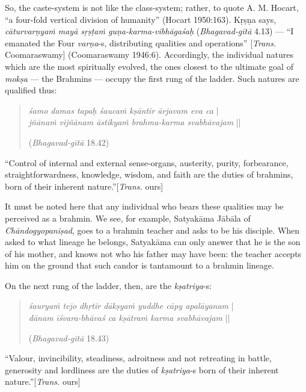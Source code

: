So, the caste-system is not like the class-system; rather, to quote A. M. Hocart, “a four-fold vertical division of humanity” (Hocart 1950:163). Kṛṣṇa says, {\sl cāturvarṇyaṁ mayā sṛṣṭaṁ guṇa-karma-vibhāgaśaḥ} ({\sl Bhagavad-gītā} 4.13) --- ``I emanated the Four {\sl varṇa}-s, distributing qualities and operations'' [{\sl Trans.} Coomaraswamy] (Coomaraswamy 1946:6). Accordingly, the individual natures which are the most spiritually evolved, the ones closest to the ultimate goal of {\sl mokṣa} --- the Brahmins --- occupy the first rung of the ladder. Such natures are qualified thus:
\begin{quote}
{{\sl śamo damas tapaḥ śaucaṁ kṣāntir ārjavam eva ca}} |\\
{\sl jñānaṁ vijñānam āstikyaṁ brahma-karma svabhāvajam} || 

\hfill ({\sl Bhagavad-gītā} 18.42)
\end{quote}

\begin{myquote}
“Control of internal and external sense-organs, austerity, purity, forbearance, straightforwardness, knowledge, wisdom, and faith are the duties of brahmins, born of their inherent nature.”\hfill [{\sl Trans.} ours]
\end{myquote}

It must be noted here that any individual who bears these qualities may be perceived as a brahmin. We see, for example, Satyakāma Jābāla of {\sl Chāndogyopaniṣad}, goes to a brahmin teacher and asks to be his disciple. When asked to what lineage he belongs, Satyakāma can only answer that he is the son of his mother, and knows not who his father may have been: the teacher accepts him on the ground that such candor is tantamount to a brahmin lineage. 

\newpage

On the next rung of the ladder, then, are the {\sl kṣatriya}-s:
\begin{quote}
{{\sl śauryaṁ tejo dhṛtir dākṣyaṁ yuddhe cāpy apalāyanam}} |\\
{\sl dānam īśvara-bhāvaś ca kṣātraṁ karma svabhāvajam} || 

\hfill ({\sl Bhagavad-gītā} 18.43)
\end{quote}

\begin{myquote}
“Valour, invincibility, steadiness, adroitness and not retreating in battle, generosity and lordliness are the duties of {\sl kṣatriya}-s born of their inherent nature.”\hfill [{\sl Trans.} ours]
\end{myquote}

